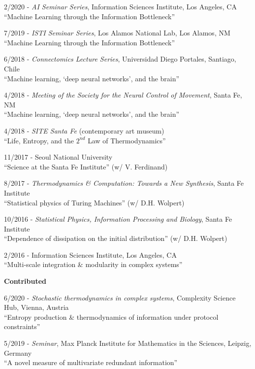 \documentclass[margin,line,centered]{res}
\begin{document}
\begin{resume}
2/2020 - \emph{AI Seminar Series}, Information Sciences Institute, Los Angeles, CA\\
``Machine Learning through the Information Bottleneck'' %

7/2019 - \emph{ISTI Seminar Series}, Los Alamos National Lab, Los Alamos, NM\\
``Machine Learning through the Information Bottleneck''  %


6/2018 - \emph{Connectomics Lecture Series}, Universidad Diego Portales, Santiago, Chile\\
``Machine learning, `deep neural networks', and the brain''  %

4/2018 - \emph{Meeting of the Society for the Neural Control of Movement}, Santa Fe, NM\\
``Machine learning, `deep neural networks', and the brain''

4/2018 - \emph{SITE Santa Fe} (contemporary art museum)\\
``Life, Entropy, and the $2^{{nd}}$ Law of Thermodynamics''

11/2017 - Seoul National University\\
``Science at the Santa Fe Institute'' (w/ V. Ferdinand) %

8/2017 - \emph{Thermodynamics \& Computation: Towards a New Synthesis}, Santa Fe Institute\\
``Statistical physics of Turing Machines'' (w/ D.H. Wolpert) %

10/2016 - \emph{Statistical Physics, Information Processing and Biology}, Santa Fe Institute \\
``Dependence of dissipation on the initial distribution'' (w/ D.H. Wolpert) %

2/2016 - Information Sciences Institute, Los Angeles, CA\\
``Multi-scale integration \& modularity in complex systems'' %


\vspace{5pt}

\textbf{Contributed}

6/2020 - \emph{Stochastic thermodynamics in complex systems}, Complexity Science Hub, Vienna, Austria\\
``Entropy production \& thermodynamics of information under protocol constraints''

5/2019 - \emph{Seminar}, Max Planck Institute for Mathematics in the Sciences, Leipzig, Germany\\
``A novel measure of multivariate redundant information''


\end{resume}
\end{document}
